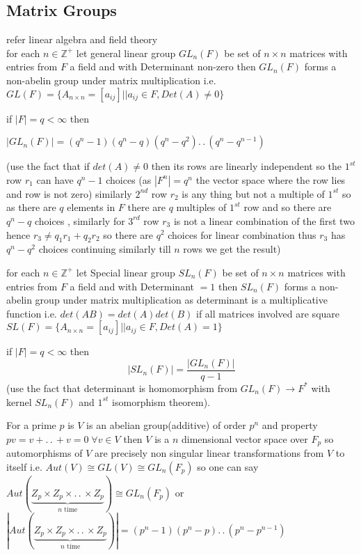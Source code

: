 \documentclass[11pt]{extarticle}
\newcommand{\Z}{\mathbb{Z}}
\newcommand{\ra}{\rightarrow}
\newcommand{\w}[1]{\text{#1}}
\newcommand{\ck}{.\,.\,}
\newcommand{\snote}[1]{{\footnotesize(#1)}}
\newcommand{\tbx}[2][]{
	\begin{tcolorbox}[enhanced,breakable,size=small,colback=black!2!white,title={#1},arc is angular, arc=1.5mm,drop fuzzy shadow]
		#2
	\end{tcolorbox}
}
\newcommand{\tm}{\times}
\begin{document}
\begin{multicols}{2}
	\subsection{Matrix Groups}
\tbx{ refer linear algebra and field theory \\
 for each $ n\in \Z^+ $ let general linear group $ GL_n(F) $ be set of $ n \tm n $ matrices with entries from $ F $ a field and with Determinant non-zero then $ GL_n(F) $ forms a non-abelin group  under matrix multiplication i.e.\\
$ GL(F) = \{A_{n\tm n}=[a_{ij}]|| a_{ij}\in F, Det(A)\neq 0\}$ }
 \tbx{if $ |F|=q<\infty $ then 
 	\begin{center}
 		$ |GL_n(F) |=(q^n-1)(q^n-q)(q^n-q^2)\ck (q^n-q^{n-1})$
 	\end{center}
\snote{use the fact that if $ det(A)\neq 0 $ then its rows are linearly independent so the $1^{st} $ row $r_1$ can have $ q^n-1 $ choices (as $ |F^n|=q^n $ the vector space where the row lies and row is not zero) similarly $ 2^{nd} $ row $ r_2 $ is any thing but not a multiple of $ 1^{st} $ so as there are $ q $ elements in $ F $ there are $ q $ multiples of $ 1^{st} $ row and so there are $ q^n-q $ choices , similarly for $ 3^{rd} $ row $ r_3 $ is not a linear combination of the first two hence $ r_3\neq q_1 r_1+q_2r_2 $ so there are $ q^2 $ choices for linear combination thus $r_3 $ has $ q^n-q^2 $ choices continuing similarly till $ n $ rows we get the result}}
\tbx{ 
	for each $ n\in \Z^+ $ let Special linear group $ SL_n(F) $ be set of $ n \tm n $ matrices with entries from $ F $ a field and with Determinant $ =1 $ then $ SL_n(F) $ forms a non-abelin group  under matrix multiplication as determinant is a multiplicative function i.e. $ det(AB)=det(A)det(B)$ if all matrices involved are square\\
	$ SL(F) =\{A_{n\tm n}=[a_{ij}]|| a_{ij}\in F, Det(A)=1\}$ }
	\tbx{ if $ |F|=q<\infty  $ then 
	\[|SL_n(F)|= \frac{ |GL_n(F) |}{q-1} \]  
	\snote{use the fact that determinant is homomorphism from $ GL_n(F)\ra F^* $ with kernel $ SL_n(F) $ and $ 1^{st} $ isomorphism theorem}.}
	\tbx{ For a prime $ p $ is $ V $ is an abelian group(additive) of order $ p^n $ and property $ pv=v+\ck+v=0 \; \forall v\in V $ then $ V $ is a $ n $ dimensional vector space over $ F_p $ so automorphisms of $ V $ are precisely non singular linear transformations from $ V $ to itself i.e. $ Aut(V) \cong GL(V)\cong GL_n(F_p)$ so one can say $ Aut(\underbrace{Z_p\tm Z_p\tm \ck \tm Z_p}_{n\w{ time}}) \cong GL_n(F_p)$ or $ | Aut(\underbrace{Z_p\tm Z_p\tm \ck \tm Z_p}_{n\w{ time}}) |=(p^n-1)(p^n-p)\ck (p^n-p^{n-1}) $ }

\end{multicols}
\end{document}

